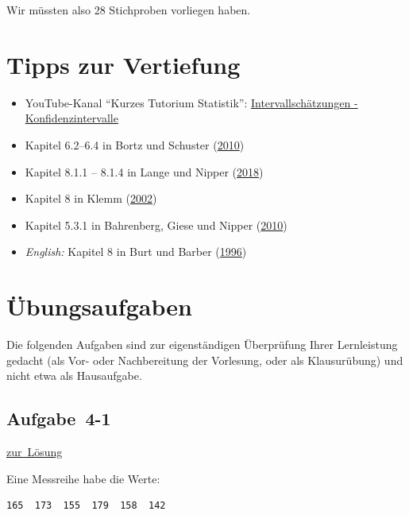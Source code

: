 \documentclass[
  11pt,
  ngerman,
  a4paper,
]{report}
\providecommand{\tightlist}{%
  \setlength{\itemsep}{0pt}\setlength{\parskip}{0pt}}
\begin{document}
Wir müssten also 28 Stichproben vorliegen haben.

\hypertarget{tipps-zur-vertiefung-3}{%
\section*{Tipps zur Vertiefung}\label{tipps-zur-vertiefung-3}}

\begin{itemize}
\tightlist
\item
  YouTube-Kanal \enquote{Kurzes Tutorium Statistik}: \href{https://www.youtube.com/watch?v=DdwTa28W4Os}{Intervallschätzungen - Konfidenzintervalle}
\item
  Kapitel 6.2--6.4 in Bortz und Schuster (\protect\hyperlink{ref-bortz}{2010})
\item
  Kapitel 8.1.1 -- 8.1.4 in Lange und Nipper (\protect\hyperlink{ref-delange}{2018})
\item
  Kapitel 8 in Klemm (\protect\hyperlink{ref-klemm}{2002})
\item
  Kapitel 5.3.1 in Bahrenberg, Giese und Nipper (\protect\hyperlink{ref-bahrenberg}{2010})
\item
  \emph{English:} Kapitel 8 in Burt und Barber (\protect\hyperlink{ref-burt}{1996})
\end{itemize}

\hypertarget{uxfcbungsaufgaben-3}{%
\section*{Übungsaufgaben}\label{uxfcbungsaufgaben-3}}

Die folgenden Aufgaben sind zur eigenständigen Überprüfung Ihrer Lernleistung gedacht (als Vor- oder Nachbereitung der Vorlesung, oder als Klausurübung) und nicht etwa als Hausaufgabe.

\hypertarget{aufgabe-4-1}{%
\subsection{Aufgabe~4-1}\label{aufgabe-4-1}}

\protect\hyperlink{loesung-4-1}{zur~Lösung}

Eine Messreihe habe die Werte:

\begin{verbatim}
165  173  155  179  158  142
\end{verbatim}
\end{document}
